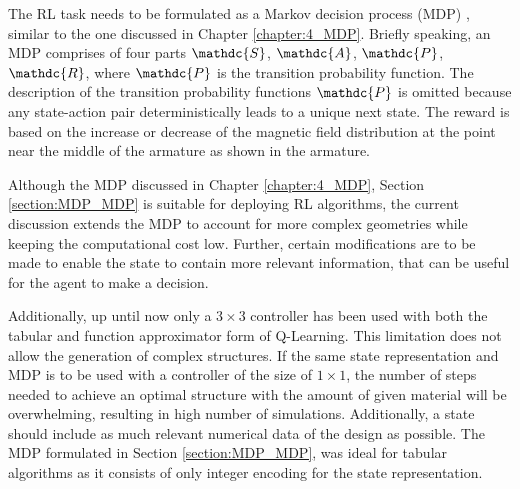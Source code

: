 The RL task needs to be formulated as a Markov decision process (MDP) \parencite{bellman1957markovian}, similar to the one discussed in Chapter \ref{chapter:4_MDP}. Briefly speaking, an MDP comprises of four parts $\mathdc{S}$, $\mathdc{A}$, $\mathdc{P}$, $\mathdc{R}$, where $\mathdc{P}$ is the transition probability function. The description of the transition probability functions $\mathdc{P}$ is omitted because any state-action pair deterministically leads to a unique next state. The reward is based on the increase or decrease of the magnetic field distribution at the point near the middle of the armature as shown in the armature.

Although the MDP discussed in Chapter \ref{chapter:4_MDP}, Section \ref{section:MDP_MDP} is suitable for deploying RL algorithms, the current discussion extends the MDP to account for more complex geometries while keeping the computational cost low.
Further, certain modifications are to be made to enable the state to contain more relevant information, that can be useful for the agent to make a decision. 

Additionally, up until now only a $3 \times 3$ controller has been used with both the tabular and function approximator form of Q-Learning. This limitation does not allow the generation of complex structures.
If the same state representation and MDP is to be used with a controller of the size of $1 \times 1$, the number of steps needed to achieve an optimal structure with the amount of given material will be overwhelming, resulting in high number of simulations.
Additionally, a state should include as much relevant numerical data of the design as possible. The MDP formulated in Section \ref{section:MDP_MDP}, was ideal for tabular algorithms as it consists of only integer encoding for the state representation. 

